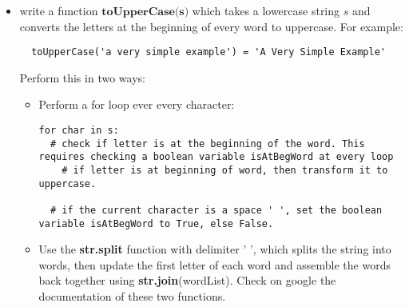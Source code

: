 \documentclass[11pt,a4paper]{report}
\begin{document}
\begin{itemize}
  \item write a function $\textbf{toUpperCase(s)}$ which takes a lowercase string $s$ and converts the letters at the beginning of every word to uppercase. For example: 
  \begin{lstlisting}
  toUpperCase('a very simple example') = 'A Very Simple Example'
  \end{lstlisting}   
  Perform this in two ways:
  \begin{itemize}
   \item Perform a for loop ever every character:
     \begin{lstlisting}
for char in s:
  # check if letter is at the beginning of the word. This requires checking a boolean variable isAtBegWord at every loop
    # if letter is at beginning of word, then transform it to uppercase. 
    
  # if the current character is a space ' ', set the boolean variable isAtBegWord to True, else False.
  \end{lstlisting}  
  \item Use the \textbf{str.split} function with delimiter ' ', which splits the string into words, then update the first letter of each word and assemble the words back together using \textbf{str.join}(wordList). Check on google the documentation of these two functions. 
  
  \end{itemize}


\end{itemize}
\end{document}
